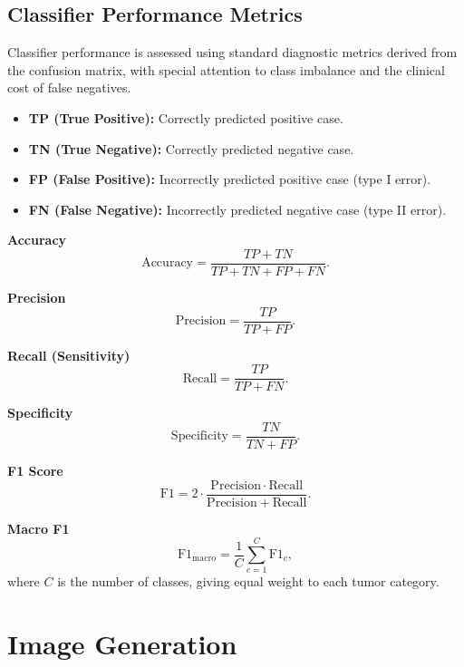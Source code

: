 \subsection{Classifier Performance Metrics}

Classifier performance is assessed using standard diagnostic metrics derived from the confusion matrix, with special attention to class imbalance and the clinical cost of false negatives.

\begin{itemize}
    \item \textbf{TP (True Positive):} Correctly predicted positive case.
    \item \textbf{TN (True Negative):} Correctly predicted negative case.
    \item \textbf{FP (False Positive):} Incorrectly predicted positive case (type I error).
    \item \textbf{FN (False Negative):} Incorrectly predicted negative case (type II error).
\end{itemize}

\textbf{Accuracy}
\begin{equation}
\mathrm{Accuracy} = \frac{TP + TN}{TP + TN + FP + FN}.
\end{equation}

\textbf{Precision}
\begin{equation}
\mathrm{Precision} = \frac{TP}{TP + FP}.
\end{equation}

\textbf{Recall (Sensitivity)}
\begin{equation}
\mathrm{Recall} = \frac{TP}{TP + FN}.
\end{equation}

\textbf{Specificity}
\begin{equation}
\mathrm{Specificity} = \frac{TN}{TN + FP}.
\end{equation}

\textbf{F1 Score}
\begin{equation}
\mathrm{F1} = 2 \cdot \frac{\mathrm{Precision}\cdot\mathrm{Recall}}{\mathrm{Precision}+\mathrm{Recall}}.
\end{equation}

\textbf{Macro F1}
\begin{equation}
\mathrm{F1}_{\mathrm{macro}} = \frac{1}{C}\sum_{c=1}^{C} \mathrm{F1}_c,
\end{equation}
where $C$ is the number of classes, giving equal weight to each tumor category.


\section{Image Generation}

